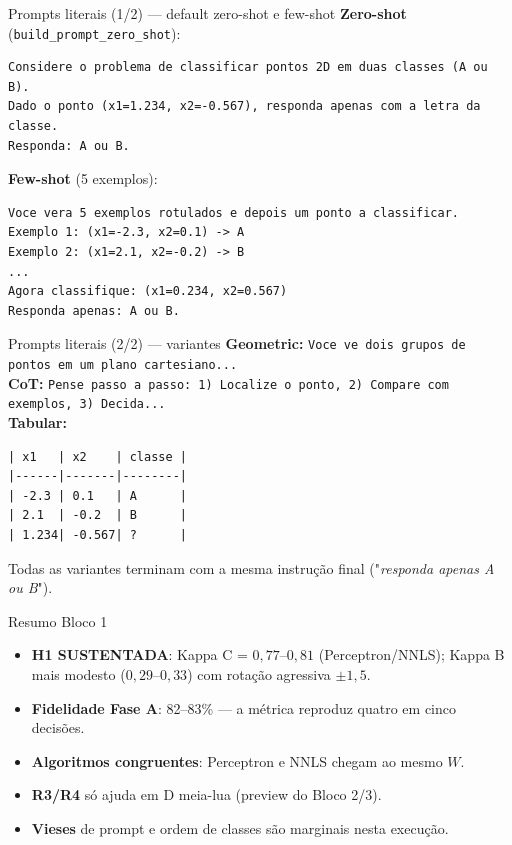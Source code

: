 \documentclass[aspectratio=169,10pt]{beamer}
\begin{document}
\begin{frame}[fragile]{Prompts literais (1/2) --- default zero-shot e few-shot}
  \tiny
  \textbf{Zero-shot} (\texttt{build\_prompt\_zero\_shot}):
  \begin{verbatim}
Considere o problema de classificar pontos 2D em duas classes (A ou B).
Dado o ponto (x1=1.234, x2=-0.567), responda apenas com a letra da classe.
Responda: A ou B.
  \end{verbatim}
  \textbf{Few-shot} (5 exemplos):
  \begin{verbatim}
Voce vera 5 exemplos rotulados e depois um ponto a classificar.
Exemplo 1: (x1=-2.3, x2=0.1) -> A
Exemplo 2: (x1=2.1, x2=-0.2) -> B
...
Agora classifique: (x1=0.234, x2=0.567)
Responda apenas: A ou B.
  \end{verbatim}
\end{frame}

\begin{frame}[fragile]{Prompts literais (2/2) --- variantes}
  \tiny
  \textbf{Geometric:} \texttt{Voce ve dois grupos de pontos em um plano cartesiano...}\\
  \textbf{CoT:} \texttt{Pense passo a passo: 1) Localize o ponto, 2) Compare com exemplos, 3) Decida...}\\
  \textbf{Tabular:}
  \begin{verbatim}
| x1   | x2    | classe |
|------|-------|--------|
| -2.3 | 0.1   | A      |
| 2.1  | -0.2  | B      |
| 1.234| -0.567| ?      |
  \end{verbatim}
  Todas as variantes terminam com a mesma instru\c{c}\~ao final ("\emph{responda apenas A ou B}").
\end{frame}

\begin{frame}{Resumo Bloco 1}
  \footnotesize
  \begin{itemize}
    \item \textbf{H1 SUSTENTADA}: Kappa C = $0{,}77$--$0{,}81$ (Perceptron/NNLS); Kappa B mais modesto ($0{,}29$--$0{,}33$) com rota\c{c}\~ao agressiva $\pm 1{,}5$.
    \item \textbf{Fidelidade Fase A}: 82--83\% --- a m\'etrica reproduz quatro em cinco decis\~oes.
    \item \textbf{Algoritmos congruentes}: Perceptron e NNLS chegam ao mesmo $W$.
    \item \textbf{R3/R4} s\'o ajuda em D meia-lua (preview do Bloco 2/3).
    \item \textbf{Vieses} de prompt e ordem de classes s\~ao marginais nesta execu\c{c}\~ao.
  \end{itemize}
\end{frame}
\end{document}
